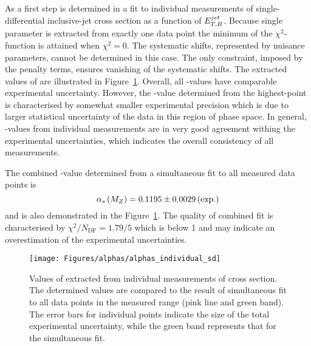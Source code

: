 As a first step \asz is determined in a fit to individual measurements of single-differential inclusive-jet cross section as a function of $\mbox{$E_{T,B}^{jet}$}$. Because single parameter is extracted from exactly one data point the minimum of the $\chi^2$-function is attained when $\chi^2=0$. The systematic shifts, represented by nuisance parameters, cannot be determined in this case. The only constraint, imposed by the penalty terms, ensures vanishing of the systematic shifts. The extracted values of \asz are illustrated in Figure~\ref{fig:alphassinglediffindividual}. Overall, all \as-values have comparable experimental uncertainty. However, the \as-value determined from the highest-\etjetb point is characterised by somewhat smaller experimental precision which is due to larger statistical uncertainty of the data in this region of phase space. In general, \as-values from individual measurements are in very good agreement withing the experimental uncertainties, which indicates the overall consistency of all measurements.

The combined \asz-value determined from a simultaneous fit to all measured data points is
\begin{equation}
 \asz = 0.1195 \pm 0.0029 \left( \text{exp.} \right) %
 \label{eq:assingledifval}
\end{equation}
and is also demonstrated in the Figure~\ref{fig:alphassinglediffindividual}. The quality of combined fit is characterised by $\chi^2/N_\text{DF}=1.79/5$ which is below 1 and may indicate an overestimation of the experimental uncertainties.

\begin{figure}[tp]
 \begin{center}
 \texttt{[image: Figures/alphas/alphas\_individual\_sd]}
\end{center}
 \caption{Values of \asz extracted from individual measurements of \dsdetjetb cross section. The determined values are compared to the result of simultaneous fit to all data points in the measured \etjetb range (pink line and green band). The error bars for individual points indicate the size of the total experimental uncertainty, while the green band represents that for the simultaneous fit.}
 \label{fig:alphassinglediffindividual}
\end{figure}

